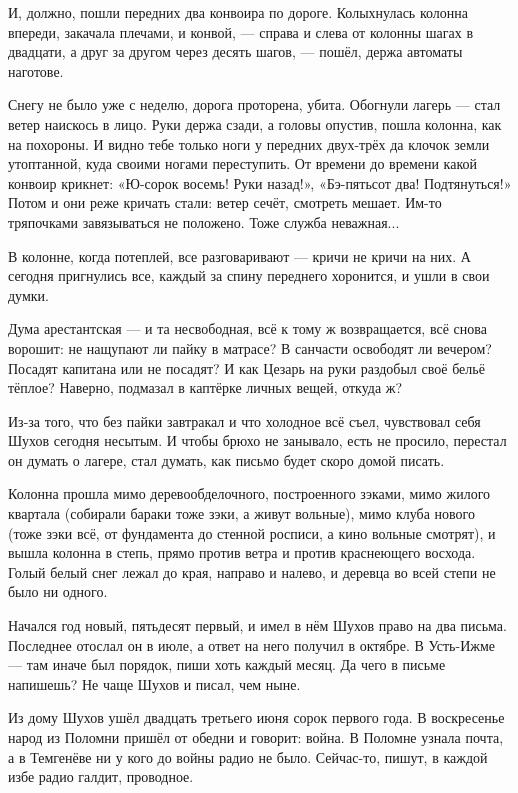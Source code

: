 И, должно, пошли передних два конвоира по дороге. Колыхнулась колонна впереди, закачала
плечами, и конвой, --- справа и слева от колонны шагах в двадцати, а друг за другом через десять
шагов, --- пошёл, держа автоматы наготове.

Снегу не было уже с неделю, дорога проторена, убита. Обогнули лагерь --- стал ветер наискось в
лицо. Руки держа сзади, а головы опустив, пошла колонна, как на похороны. И видно тебе только
ноги у передних двух-трёх да клочок земли утоптанной, куда своими ногами переступить. От
времени до времени какой конвоир крикнет: «Ю-сорок восемь! Руки назад!», «Бэ-пятьсот два!
Подтянуться!» Потом и они реже кричать стали: ветер сечёт, смотреть мешает. Им-то тряпочками
завязываться не положено. Тоже служба неважная...

В колонне, когда потеплей, все разговаривают --- кричи не кричи на них. А сегодня пригнулись
все, каждый за спину переднего хоронится, и ушли в свои думки.

Дума арестантская --- и та несвободная, всё к тому ж возвращается, всё снова ворошит: не
нащупают ли пайку в матрасе? В санчасти освободят ли вечером? Посадят капитана или не
посадят? И как Цезарь на руки раздобыл своё бельё тёплое? Наверно, подмазал в каптёрке личных
вещей, откуда ж?

Из-за того, что без пайки завтракал и что холодное всё съел, чувствовал себя Шухов сегодня
несытым. И чтобы брюхо не занывало, есть не просило, перестал он думать о лагере, стал думать,
как письмо будет скоро домой писать.

Колонна прошла мимо деревообделочного, построенного зэками, мимо жилого квартала (собирали
бараки тоже зэки, а живут вольные), мимо клуба нового (тоже зэки всё, от фундамента до стенной
росписи, а кино вольные смотрят), и вышла колонна в степь, прямо против ветра и против
краснеющего восхода. Голый белый снег лежал до края, направо и налево, и деревца во всей
степи не было ни одного.

Начался год новый, пятьдесят первый, и имел в нём Шухов право на два письма. Последнее
отослал он в июле, а ответ на него получил в октябре. В Усть-Ижме --- там иначе был порядок, пиши
хоть каждый месяц. Да чего в письме напишешь? Не чаще Шухов и писал, чем ныне.

Из дому Шухов ушёл двадцать третьего июня сорок первого года. В воскресенье народ из Поломни
пришёл от обедни и говорит: война. В Поломне узнала почта, а в Темгенёве ни у кого до войны
радио не было. Сейчас-то, пишут, в каждой избе радио галдит, проводное.

